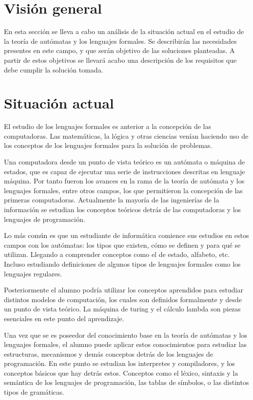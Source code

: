 \section {Visión general}
En esta sección se lleva a cabo un análisis de la situación actual en el estudio de la teoría de autómatas y los lenguajes formales. 
Se describirán las necesidades presentes en este campo, y que serán objetivo de las soluciones planteadas. A partir de estos objetivos se llevará 
acabo una descripción de los requisitos que debe cumplir la solución tomada. 

\section{Situación actual}

El estudio de los lenguajes formales es anterior a la concepción de las computadoras. Las matemáticas, la lógica y otras ciencias venían haciendo 
uso de los conceptos de los lenguajes formales para la solución de problemas. 

Una computadora desde un punto de vista teórico es un autómata o máquina de estados, que es capaz de ejecutar una serie de instrucciones descritas
en lenguaje máquina. Por tanto fueron los avances en la rama de la teoría de autómata y los lenguajes formales, entre otros campos, los que permitieron la concepción de 
las primeras computadoras. Actualmente la mayoría de las ingenierías de la información se estudian los conceptos teóricos detrás de las computadoras 
y los lenguajes de programación.

Lo más común es que un estudiante de informática comience sus estudios en estos campos con los autómatas: los tipos que existen, cómo se definen 
y para qué se utilizan. Llegando a comprender conceptos como el de estado, alfabeto, etc. Incluso estudiando definiciones de algunos tipos de lenguajes 
formales como los lenguajes regulares.  

Posteriormente el alumno podría utilizar los conceptos aprendidos para estudiar distintos modelos de computación, los cuales son definidos formalmente y desde un punto de vista teórico.
La máquina de turing y el cálculo lambda son piezas esenciales en este punto del aprendizaje. 

Una vez que se es poseedor del conocimiento base en la teoría de autómatas y los lenguajes formales, el alumno puede aplicar estos conocimientos para estudiar las estructuras, mecanismos 
y demás conceptos detrás de los lenguajes de programación. En este punto se estudian los interpretes y compiladores, y los 
conceptos básicos que hay detrás estos. Conceptos como el léxico, sintaxis y la semántica de los lenguajes de programación, las tablas de símbolos, o las distintos tipos de gramáticas. 

